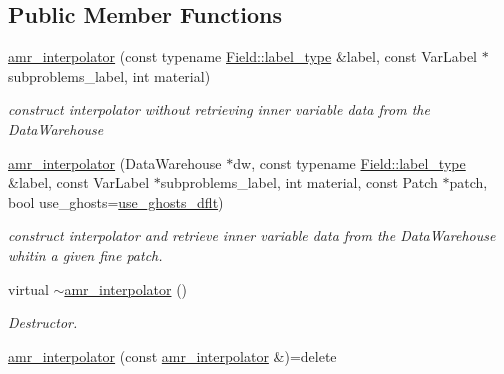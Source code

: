 \subsection*{Public Member Functions}
\begin{DoxyCompactItemize}
\item 
\hyperlink{classUintah_1_1PhaseField_1_1detail_1_1amr__interpolator_3_01ScalarField_3_01T_01_4_00_01Problem71844444bc14a03c0566689b6b502040_a9c040b7f2b8029127f93431a363bc684}{amr\+\_\+interpolator} (const typename \hyperlink{structUintah_1_1PhaseField_1_1ScalarField_a7a77875e030da64c47ce9f6c22a06959}{Field\+::label\+\_\+type} \&label, const Var\+Label $\ast$subproblems\+\_\+label, int material)
\begin{DoxyCompactList}\small\item\em construct interpolator without retrieving inner variable data from the Data\+Warehouse \end{DoxyCompactList}\item 
\hyperlink{classUintah_1_1PhaseField_1_1detail_1_1amr__interpolator_3_01ScalarField_3_01T_01_4_00_01Problem71844444bc14a03c0566689b6b502040_a7a642e4084ed35347969bda983e80191}{amr\+\_\+interpolator} (Data\+Warehouse $\ast$dw, const typename \hyperlink{structUintah_1_1PhaseField_1_1ScalarField_a7a77875e030da64c47ce9f6c22a06959}{Field\+::label\+\_\+type} \&label, const Var\+Label $\ast$subproblems\+\_\+label, int material, const Patch $\ast$patch, bool use\+\_\+ghosts=\hyperlink{classUintah_1_1PhaseField_1_1detail_1_1amr__interpolator_3_01ScalarField_3_01T_01_4_00_01Problem71844444bc14a03c0566689b6b502040_ad1c55bf968b88ce13f275aa631a69cf7}{use\+\_\+ghosts\+\_\+dflt})
\begin{DoxyCompactList}\small\item\em construct interpolator and retrieve inner variable data from the Data\+Warehouse whitin a given fine patch. \end{DoxyCompactList}\item 
virtual \hyperlink{classUintah_1_1PhaseField_1_1detail_1_1amr__interpolator_3_01ScalarField_3_01T_01_4_00_01Problem71844444bc14a03c0566689b6b502040_a82ad51ad82c3cda7754e0e283ab062b2}{$\sim$amr\+\_\+interpolator} ()
\begin{DoxyCompactList}\small\item\em Destructor. \end{DoxyCompactList}\item 
\hyperlink{classUintah_1_1PhaseField_1_1detail_1_1amr__interpolator_3_01ScalarField_3_01T_01_4_00_01Problem71844444bc14a03c0566689b6b502040_a71a0a8eed81cb7716ea9c75f0ae384d1}{amr\+\_\+interpolator} (const \hyperlink{classUintah_1_1PhaseField_1_1detail_1_1amr__interpolator}{amr\+\_\+interpolator} \&)=delete

\end{DoxyCompactItemize}
